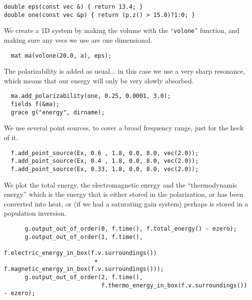 \begin{verbatim}
double eps(const vec &) { return 13.4; }
double one(const vec &p) { return (p.z() > 15.0)?1:0; }
\end{verbatim}
\begin{comment}
int main(int argc, char **argv) {
  initialize mpi(argc, argv);
  deal_with_ctrl_c();
  const double ttot = 600.0;
\end{comment}
We create a 1D system by making the volume with the ``\verb!volone!''
function, and making sure any vecs we use are one dimensional.
\begin{verbatim}
  mat ma(volone(20.0, a), eps);
\end{verbatim}
\begin{comment}
  const char *dirname = make_output_directory(argv[0]);
  ma.set_output_directory(dirname);
\end{comment}
The polarizability is added as usual... in this case we use a very sharp
resonance, which means that our energy will only be very slowly absorbed.
\begin{verbatim}
  ma.add_polarizability(one, 0.25, 0.0001, 3.0);
  fields f(&ma);
  grace g("energy", dirname);
\end{verbatim}
We use several point sources, to cover a broad frequency range, just for
the heck of it.
\begin{verbatim}
  f.add_point_source(Ex, 0.6 , 1.8, 0.0, 8.0, vec(2.0));
  f.add_point_source(Ex, 0.4 , 1.8, 0.0, 8.0, vec(2.0));
  f.add_point_source(Ex, 0.33, 1.8, 0.0, 8.0, vec(2.0));
\end{verbatim}
\begin{comment}
  const double ezero = f.total_energy();
  double next_printtime = 10;
  while (f.time() < ttot && !interrupt) {
    if (f.time() >= next_printtime) {
      next_printtime += 10;
      master_printf("Working on time %
      master_printf("energy is %
      master_printf("thermo energy is %
      //f.eps_slices();
\end{comment}
We plot the total energy, the electromagnetic energy and the
``thermodynamic energy'' which is the energy that is either stored in the
polarization, or has been converted into heat, or (if we had a saturating
gain system) perhaps is stored in a population inversion.
\begin{verbatim}
      g.output_out_of_order(0, f.time(), f.total_energy() - ezero);
      g.output_out_of_order(1, f.time(),
                            f.electric_energy_in_box(f.v.surroundings())
                          + f.magnetic_energy_in_box(f.v.surroundings()));
      g.output_out_of_order(2, f.time(),
                            f.thermo_energy_in_box(f.v.surroundings()) - ezero);
\end{verbatim}
\begin{comment}
    }
    f.step();
  }
}
\end{comment}

